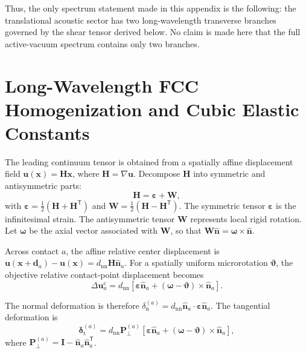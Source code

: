 Thus, the only spectrum statement made in this appendix is the following: the translational acoustic sector has two long-wavelength transverse branches governed by the shear tensor derived below. No claim is made here that the full active-vacuum spectrum contains only two branches.

\section{Long-Wavelength FCC Homogenization and Cubic Elastic Constants}

The leading continuum tensor is obtained from a spatially affine displacement field $\mathbf{u}(\mathbf{x}) = \mathbf{H}\mathbf{x}$, where $\mathbf{H}=\nabla\mathbf{u}$. Decompose $\mathbf{H}$ into symmetric and antisymmetric parts:
\begin{equation}
    \mathbf{H} = \boldsymbol{\varepsilon}+\mathbf{W},
\end{equation}
with $\boldsymbol{\varepsilon} = \frac{1}{2}(\mathbf{H}+\mathbf{H}^{\mathsf{T}})$ and $\mathbf{W} = \frac{1}{2}(\mathbf{H}-\mathbf{H}^{\mathsf{T}})$. The symmetric tensor $\boldsymbol{\varepsilon}$ is the infinitesimal strain. The antisymmetric tensor $\mathbf{W}$ represents local rigid rotation. Let $\boldsymbol{\omega}$ be the axial vector associated with $\mathbf{W}$, so that $\mathbf{W}\hat{\mathbf{n}} = \boldsymbol{\omega}\times\hat{\mathbf{n}}$.

Across contact $a$, the affine relative center displacement is $\mathbf{u}(\mathbf{x}+\mathbf{d}_a)-\mathbf{u}(\mathbf{x}) = d_{\mathrm{nn}} \mathbf{H}\hat{\mathbf{n}}_a$. For a spatially uniform microrotation $\boldsymbol{\vartheta}$, the objective relative contact-point displacement becomes
\begin{equation}
    \Delta\mathbf{u}_a^{\mathrm{c}} = d_{\mathrm{nn}} \left[ \boldsymbol{\varepsilon}\hat{\mathbf{n}}_a + (\boldsymbol{\omega}-\boldsymbol{\vartheta}) \times \hat{\mathbf{n}}_a \right].
\end{equation}

The normal deformation is therefore $\delta_{\mathrm{n}}^{(a)} = d_{\mathrm{nn}} \hat{\mathbf{n}}_a \cdot \boldsymbol{\varepsilon} \hat{\mathbf{n}}_a$. The tangential deformation is
\begin{equation}
    \boldsymbol{\delta}_{\mathrm{t}}^{(a)} = d_{\mathrm{nn}} \mathbf{P}_\perp^{(a)} \left[ \boldsymbol{\varepsilon}\hat{\mathbf{n}}_a + (\boldsymbol{\omega}-\boldsymbol{\vartheta}) \times \hat{\mathbf{n}}_a \right],
\end{equation}
where $\mathbf{P}_\perp^{(a)} = \mathbf{I}-\hat{\mathbf{n}}_a\hat{\mathbf{n}}_a^{\mathsf{T}}$.

